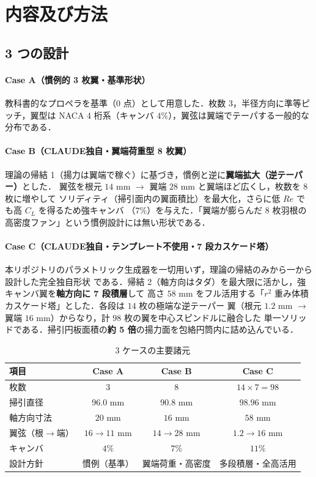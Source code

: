 \documentclass[a4paper,11pt]{jsarticle}
\begin{document}
\section{内容及び方法}

\subsection{3 つの設計}

\paragraph{Case A（慣例的 3 枚翼・基準形状）}
教科書的なプロペラを基準（0 点）として用意した．枚数 3，半径方向に準等ピッチ，翼型は
NACA 4 桁系（キャンバ $4\%$），翼弦は翼端でテーパする一般的な分布である．

\paragraph{Case B（CLAUDE独自・翼端荷重型 8 枚翼）}
理論の帰結 1（揚力は翼端で稼ぐ）に基づき，慣例と逆に\textbf{翼端拡大（逆テーパー）}とした．
翼弦を根元 $14$ mm $\to$ 翼端 $28$ mm と翼端ほど広くし，枚数を $8$ 枚に増やして
ソリディティ（掃引面内の翼面積比）を最大化，さらに低 $Re$ でも高 $C_L$ を得るため強キャンバ
（$7\%$）を与えた．「翼端が膨らんだ 8 枚羽根の高密度ファン」という慣例設計には無い形状である．

\paragraph{Case C（CLAUDE独自・テンプレート不使用・7 段カスケード塔）}
本リポジトリのパラメトリック生成器を一切用いず，理論の帰結のみから一から設計した完全独自形状
である．帰結 2（軸方向はタダ）を最大限に活かし，強キャンバ翼を\textbf{軸方向に 7 段積層}して
高さ $58$ mm をフル活用する「$r^2$ 重み体積カスケード塔」とした．各段は $14$ 枚の極端な逆テーパー
翼（根元 $1.2$ mm $\to$ 翼端 $16$ mm）からなり，計 $98$ 枚の翼を中心スピンドルに融合した
単一ソリッドである．掃引円板面積の\textbf{約 5 倍}の揚力面を包絡円筒内に詰め込んでいる．

\begin{table}[htbp]
  \centering
  \caption{3 ケースの主要諸元}
  \begin{tabular}{l|ccc}
    \hline
    項目 & Case A & Case B & Case C \\
    \hline
    枚数 & 3 & 8 & $14\times7=98$ \\
    掃引直径 & $96.0$ mm & $90.8$ mm & $98.96$ mm \\
    軸方向寸法 & $20$ mm & $16$ mm & $58$ mm \\
    翼弦（根$\to$端） & $16\to11$ mm & $14\to28$ mm & $1.2\to16$ mm \\
    キャンバ & $4\%$ & $7\%$ & $11\%$ \\
    設計方針 & 慣例（基準） & 翼端荷重・高密度 & 多段積層・全高活用 \\
    \hline
  \end{tabular}
\end{table}
\end{document}
